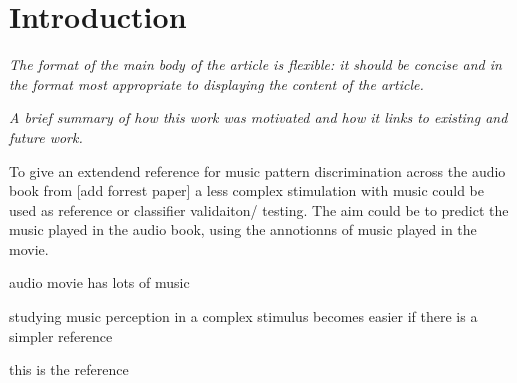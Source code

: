 \section*{Introduction} 
\textit{The format of the main body of the article is flexible: it should be concise and in the format most appropriate to displaying the content of the article.}

\textit{A brief summary of how this work was motivated and how it links to existing and future work.}

To give an extendend reference for music pattern discrimination across the audio book from [add forrest paper] a less complex stimulation with music could be used as reference or classifier validaiton/ testing. The aim could be to predict the music played in the audio book, using the annotionns of music played in the movie.

audio movie has lots of music


studying music perception in a complex stimulus becomes easier if there is a simpler reference

this is the reference

\cite{Casey_2012}